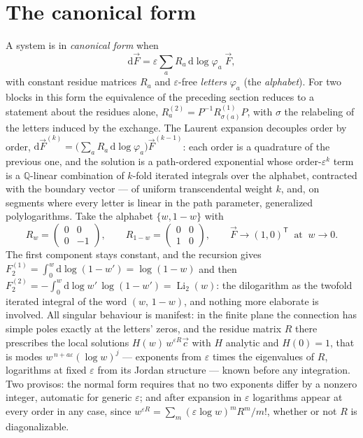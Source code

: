 \documentclass[11pt]{article}
\newcommand{\eps}{\varepsilon}
\newcommand{\dd}{\mathrm{d}}
\newcommand{\Q}{\mathbb{Q}}
\begin{document}
\section{The canonical form}
A system is in \emph{canonical form} when
\begin{equation}
  \dd \vec F = \eps \sum_a R_a\, \dd\log \varphi_a\;\vec F ,
\end{equation}
with constant residue matrices $R_a$ and $\eps$-free \emph{letters}
$\varphi_a$ (the \emph{alphabet}).  For two blocks in this form the
equivalence of the preceding section reduces to a statement about the
residues alone, $R^{(2)}_a = P^{-1}R^{(1)}_{\sigma(a)}P$, with
$\sigma$ the relabeling of the letters induced by the exchange.  The
Laurent expansion decouples order by order,
$\dd\vec F^{(k)} = \big(\sum_a R_a\,\dd\log\varphi_a\big)\vec
F^{(k-1)}$: each order is a quadrature of the previous one, and the
solution is a path-ordered exponential whose order-$\eps^k$ term is
a $\Q$-linear combination of $k$-fold iterated integrals over the
alphabet, contracted with the boundary vector --- of uniform
transcendental weight $k$, and, on segments where every letter is
linear in the path parameter, generalized polylogarithms.  Take the
alphabet
$\{w, 1-w\}$ with
\begin{equation}
  R_w = \begin{pmatrix} 0 & 0\\ 0 & -1\end{pmatrix},
  \qquad
  R_{1-w} = \begin{pmatrix} 0 & 0\\ 1 & 0\end{pmatrix},
  \qquad
  \vec F \to (1,0)^{\mathsf T} \ \text{ at } \ w \to 0 .
\end{equation}
The first component stays constant, and the recursion gives
$F_2^{(1)} = \int_0^w \dd\log(1-w') = \log(1-w)$ and then
$F_2^{(2)} = -\int_0^w \dd\log w'\,\log(1-w')
= \operatorname{Li}_2(w)$: the dilogarithm as the twofold iterated
integral of the word $(w,\,1{-}w)$, and nothing more elaborate is
involved.  All singular behaviour is manifest: in the finite plane
the connection has simple poles exactly at the letters' zeros, and
the residue matrix $R$ there prescribes the local solutions
$H(w)\,w^{\eps R}\vec c$ with $H$ analytic and $H(0)=1$, that is
modes $w^{\,n+a\eps}(\log w)^j$ --- exponents from $\eps$ times the
eigenvalues of $R$, logarithms at fixed $\eps$ from its Jordan
structure --- known before any integration.  Two provisos: the normal
form requires that no two exponents differ by a nonzero integer,
automatic for generic $\eps$; and after expansion in $\eps$
logarithms appear at every order in any case, since
$w^{\eps R} = \sum_m (\eps\log w)^m R^m/m!$, whether or not $R$ is
diagonalizable.
\end{document}
